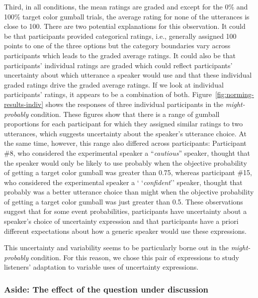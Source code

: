 Third, in all conditions, the mean ratings are graded and except for the 0\% and 100\% target color gumball trials, the average rating for none of the
utterances is close to 100. There are two potential explanations for this observation. It could be that participants provided categorical ratings, i.e.,
generally assigned 100 points to one of the three options but the category boundaries vary across participants which leads to the graded average ratings.
It could also be that participants' individual ratings are graded which could reflect participants' uncertainty about which utterance a speaker would use 
and that these individual graded ratings drive the  graded average ratings. If we look at individual participants' ratings, it appears to be a combination of both.
Figure~\ref{fig:norming-results-indiv} shows the responses of three individual participants in the \emph{might-probably} condition. These figures show that there 
is a range of gumball proportions for each participant for which they assigned similar ratings to two utterances, which suggests uncertainty about the speaker's 
utterance choice. At the same time, however, this range also differed across participants: Participant \#8, who considered the experimental speaker a 
``\textit{cautious}'' speaker, thought that the speaker would only be likely to use {\sc probably} 
when the objective probability of getting a target color gumball was greater than 0.75, whereas participant \#15, who considered the experimental speaker a `
`\textit{confident}'' speaker, thought that  {\sc probably} was a better utterance choice than {\sc might} 
when the objective probability of getting a target color gumball was just greater than 0.5. These observations suggest that for some event probabilities, participants have uncertainty  about a 
speaker's choice of uncertainty expression and that participants have a priori different expectations about how a generic speaker would use these expressions.

This uncertainty and variability seems to be particularly borne out in the \emph{might-probably} condition. For this reason, we chose this pair of expressions
to study listeners' adaptation to variable uses of uncertainty expressions.

\subsubsection{Aside: The effect of the question under discussion}

